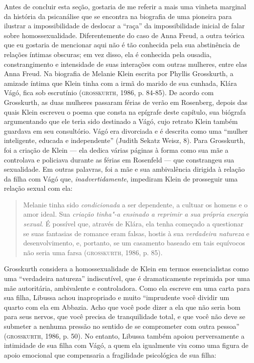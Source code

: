 Antes de concluir esta seção, gostaria de me referir a mais uma vinheta
marginal da história da psicanálise que se encontra na biografia de uma
pioneira para ilustrar a impossibilidade de deslocar a ``raça'' da
impossibilidade inicial de falar sobre homossexualidade. Diferentemente
do caso de Anna Freud, a outra teórica que eu gostaria de mencionar aqui
não é tão conhecida pela sua abstinência de relações íntimas obscuras;
em vez disso, ela é conhecida pela ousadia, constrangimento e
intensidade de suas interações com outras mulheres, entre elas Anna
Freud. Na biografia de Melanie Klein escrita por Phyllis Grosskurth, a
amizade íntima que Klein tinha com a irmã do marido de sua cunhada,
Klára Vágó, fica sob escrutínio (\textsc{grosskurth}, 1986, p. 84-85). De acordo com
Grosskurth, as duas mulheres passaram férias de verão em Rosenberg,
depois das quais Klein escreveu o poema que consta na epígrafe deste
capítulo, sua biógrafa argumentando que ele teria sido destinado a Vágó,
cujo retrato Klein também guardava em seu consultório. Vágó era
divorciada e é descrita como uma ``mulher inteligente, educada e
independente'' (Judith Sekatz Weisz, 8). Para Grosskurth, foi a criação
de Klein --- ela dedica várias páginas à forma como sua mãe a controlava
e policiava durante as férias em Rosenfeld --- que constrangeu sua
sexualidade. Em outras palavras, foi a mãe e sua ambivalência dirigida à
relação da filha com Vágó que, \emph{inadvertidamente}, impediram Klein
de prosseguir uma relação sexual com ela:

\begin{quote}
Melanie tinha sido \emph{condicionada} a ser dependente, a cultuar os
homens e o amor ideal. Sua \emph{criação tinha"-a ensinado a reprimir a
sua própria energia sexual}. É possível que, através de Klára, ela tenha
começado a questionar se suas fantasias de romance eram falsas, hostis à
sua \emph{verdadeira natureza} e desenvolvimento, e, portanto, se um
casamento baseado em tais equívocos não seria uma farsa (\textsc{grosskurth},
1986, p. 85).
\end{quote}

Grosskurth considera a homossexualidade de Klein em termos
essencialistas como uma ``verdadeira natureza'' indiscutível, que é
dramaticamente reprimida por uma mãe autoritária, ambivalente e
controladora. Como ela escreve em uma carta para sua filha, Libussa
achou inapropriado e muito ``imprudente você dividir um quarto com ela
em Abbazia. Acho que você pode dizer a ela que não seria bom para seus
nervos, que você precisa de tranquilidade total, e que você não deve se
submeter a nenhuma pressão no sentido de se comprometer com outra
pessoa'' (\textsc{grosskurth}, 1986, p. 50). No entanto, Libussa também apoiou
perversamente a intimidade de sua filha com Vágó, a quem ela igualmente
viu como uma figura de apoio emocional que compensaria a fragilidade
psicológica de sua filha:

